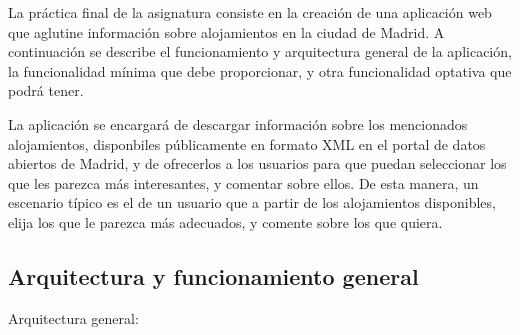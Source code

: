 La práctica final de la asignatura consiste en la creación de una aplicación web que aglutine información sobre alojamientos en la ciudad de Madrid. A continuación se describe el funcionamiento y arquitectura general de la aplicación, la funcionalidad mínima que debe proporcionar, y otra funcionalidad optativa que podrá tener.

La aplicación se encargará de descargar información sobre los mencionados alojamientos, disponbiles públicamente en formato XML en el portal de datos abiertos de Madrid, y de ofrecerlos a los usuarios para que puedan seleccionar los que les parezca más interesantes, y comentar sobre ellos. De esta manera, un escenario típico es el de un usuario que a partir de los alojamientos disponibles, elija los que le parezca más adecuados, y comente sobre los que quiera.

\subsection{Arquitectura y funcionamiento general}

Arquitectura general:

